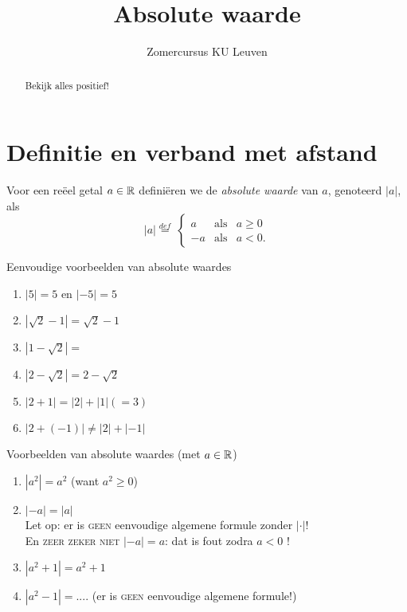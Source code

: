 \documentclass[numbers,wordchoicegiven]{ximera}
\author{Zomercursus KU Leuven}
\title[Rekenvaardigheden:]{Absolute waarde}
\begin{document}
\begin{abstract}
	Bekijk alles positief!
\end{abstract}
\maketitle

\section{Definitie en verband met afstand}\label{rv:sec:def}

\begin{definition}
	Voor een reëel getal $a\in\mathbb{R}$ definiëren we de \textit{absolute waarde} van $a$, genoteerd $|a|$, als
	\[
		|a| \overset{def}{=}\displaystyle\ 
		          \left\{
			\begin{array}{rll  } 
				a  & \mbox{als} & a \geq 0 \\
				-a & \mbox{als} & a<0.
			\end{array}\right.
	\]
\end{definition}

\begin{example} Eenvoudige voorbeelden van absolute waardes
	
		\begin{enumerate}
			\item $|5|=5$ en $|-5|=5$
			\item $|\sqrt{2}-1|=\sqrt{2} - 1$
			\item $|1-\sqrt{2}| = $
			\item $|2-\sqrt{2}| = 2 - \sqrt{2}$
			\item $|2 + 1| = |2| + | 1| (=3)$
			\item $|2 + (-1)| \neq |2| + | -1|$
		\end{enumerate}
\pdfOnly{\end{multicols}}
\end{example}
\begin{example} Voorbeelden van absolute waardes (met $a\in\mathbb{R}$)
		\begin{enumerate}[resume]
			\item $|a^2| = a^2$ (want $a^2 \geq 0$)
			\item $|-a|= |a|$ \\ Let op: er is \textsc{geen} eenvoudige algemene formule zonder $|\cdot|$! \\En \textsc{zeer zeker niet} $|-a|=a$: dat is fout zodra $a<0$ !
			\item $|a^2 + 1| = a^2 + 1$
			\item $|a^2 - 1| = ....$ \qquad(er is \textsc{geen} eenvoudige algemene formule!)
\end{enumerate}
\end{example}
\end{document}
